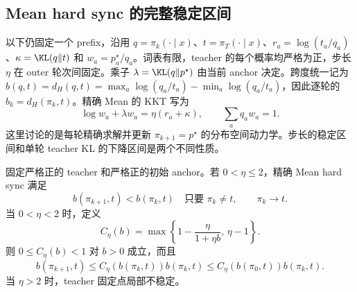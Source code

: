 \subsection{Mean hard sync 的完整稳定区间}
\label{sec:mean-hard-sync-stability}

以下仍固定一个 prefix，沿用 $q=\pi_k(\cdot\mid x)$、$t=\pi_T(\cdot\mid x)$、$r_a=\log(t_a/q_a)$、$\kappa=\KL(q\Vert t)$ 和 $w_a=p_a^\star/q_a$。词表有限，teacher 的每个概率均严格为正，步长 $\eta$ 在 outer 轮次间固定。乘子 $\lambda=\KL(q\Vert p^\star)$ 由当前 anchor 决定。跨度统一记为 $b(q,t)=d_H(q,t)=\max_a\log(q_a/t_a)-\min_a\log(q_a/t_a)$，因此逐轮的 $b_k=d_H(\pi_k,t)$。精确 Mean 的 KKT 写为
\begin{equation}
 \log w_a+\lambda w_a=\eta(r_a+\kappa),
 \qquad \sum_aq_aw_a=1.
 \label{eq:mean-hard-sync-kkt}
\end{equation}
这里讨论的是每轮精确求解并更新 $\pi_{k+1}=p^\star$ 的分布空间动力学。步长的稳定区间和单轮 teacher KL 的下降区间是两个不同性质。

\begin{theorem}
\label{thm:mean-hard-sync-full-stability}
固定严格正的 teacher 和严格正的初始 anchor。若 $0<\eta\le2$，精确 Mean hard sync 满足
\[
 b(\pi_{k+1},t)<b(\pi_k,t)
 \quad\text{只要 }\pi_k\ne t,
 \qquad \pi_k\longrightarrow t.
\]
当 $0<\eta<2$ 时，定义
\begin{equation}
 C_\eta(b)=\max\left\{1-\frac{\eta}{1+\eta b},\,\eta-1\right\}.
 \label{eq:mean-hard-sync-contraction-factor}
\end{equation}
则 $0\le C_\eta(b)<1$ 对 $b>0$ 成立，而且
\begin{equation}
 b(\pi_{k+1},t)\le C_\eta(b(\pi_k,t))b(\pi_k,t)
 \le C_\eta(b(\pi_0,t))b(\pi_k,t).
 \label{eq:mean-hard-sync-stability-geometric}
\end{equation}
当 $\eta>2$ 时，teacher 固定点局部不稳定。
\end{theorem}

